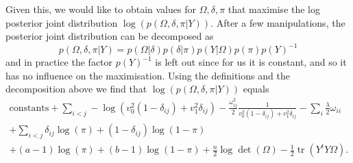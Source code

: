 \documentclass{scrartcl}
\DeclareMathOperator{\tr}{tr}
\newcommand{\inv}{^{-1}}
\begin{document}
Given this, we would like to obtain values for $\Omega, \delta, \pi$ that
maximise the log posterior joint distribution $\log(p(\Omega, \delta, \pi |
	Y))$. After a few manipulations, the posterior joint distribution can be
decomposed as \[ p(\Omega, \delta, \pi | Y) = p(\Omega | \delta) p(\delta |
	\pi) p(Y | \Omega) p(\pi) p(Y)\inv \] and in practice the factor $p(Y)\inv$ is
left out since for us it is constant, and so it has no influence on the
maximisation. Using the definitions and the decomposition above we find that
$\log(p(\Omega, \delta, \pi | Y))$ equals
\begin{multline}\label{eq:joint}
	\text{constants} + \sum_{i<j} -\log(v_0^2 (1 - \delta_{ij}) + v_1^2 \delta_{ij}) - \frac{\omega^2_{ij}}{2} \frac{1}{v_0^2 (1 - \delta_{ij}) + v_1^2 \delta_{ij}} - \sum_i \frac{\lambda}{2} \omega_{ii} \\
	+ \sum_{i < j} \delta_{ij} \log(\pi) + (1 - \delta_{ij})\log(1 - \pi)                                                                                                                \\
	+ (a-1) \log(\pi) + (b-1)\log(1 - \pi) + \frac{n}{2} \log\det(\Omega) -\frac{1}{2}\tr (Y^t Y \Omega).
\end{multline}
\end{document}
